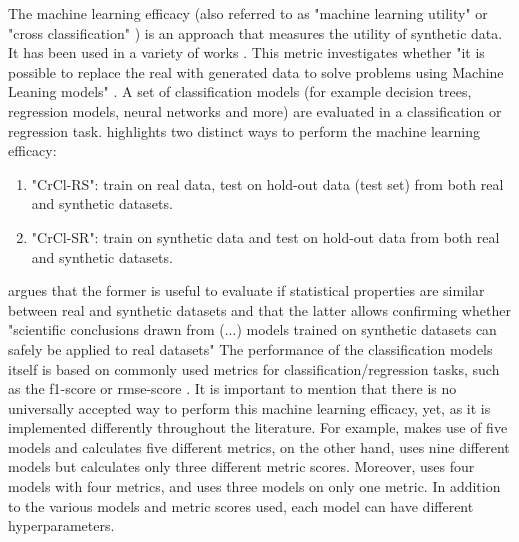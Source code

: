 The machine learning efficacy (also referred to as "machine learning utility" \cite{zhang2021GANBLRTabularData} or "cross classification" \cite{goncalves2020GenerationEvaluationSynthetic}) is an approach that measures the utility of synthetic data. 
It has been used in a variety of works \cite{zhao2022CTABGANEnhancingTabular, xu2019ModelingTabularData, zhang2021GANBLRTabularData, bourou2021ReviewTabularData, ge2021KaminoConstraintawareDifferentially}.
This metric investigates whether "it is possible to replace the real with generated data to solve problems using Machine Leaning models" \cite[p. 7]{bourou2021ReviewTabularData}.
A set of classification models (for example decision trees, regression models, neural networks and more) are evaluated in a classification or regression task.
\cite[p. 7]{goncalves2020GenerationEvaluationSynthetic} highlights two distinct ways to perform the machine learning efficacy:
\begin{enumerate}
  \item "CrCl-RS": train on real data, test on hold-out data (test set) from both real and synthetic datasets.
  \item "CrCl-SR": train on synthetic data and test on hold-out data from both real and synthetic datasets.
\end{enumerate}
\cite{goncalves2020GenerationEvaluationSynthetic} argues that the former is useful to evaluate if statistical properties are similar between real and synthetic datasets
and that the latter allows confirming whether "scientific conclusions drawn from (...) models trained on synthetic datasets can safely be applied to real datasets" \cite[p. 7]{goncalves2020GenerationEvaluationSynthetic}
The performance of the classification models itself is based on commonly used metrics for classification/regression tasks, such as the f1-score or \gls{rmse}-score \cite{bourou2021ReviewTabularData, chundawat2022UniversalMetricRobust}.
It is important to mention that there is no universally accepted way to perform this machine learning efficacy, yet, as it is implemented differently throughout the literature.
For example, \cite{zhao2022CTABGANEnhancingTabular} makes use of five models and calculates five different metrics, 
\cite{ge2021KaminoConstraintawareDifferentially} on the other hand, uses nine different models but calculates only three different metric scores.
Moreover, \cite{kunar2021DTGANDifferentialPrivatea} uses four models with four metrics, and \cite{kim2021OCTGANNeuralODEbased} uses three models on only one metric.
In addition to the various models and metric scores used, each model can have different hyperparameters.
